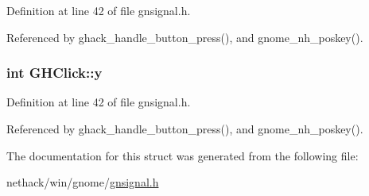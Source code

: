 Definition at line 42 of file gnsignal.\+h.



Referenced by ghack\+\_\+handle\+\_\+button\+\_\+press(), and gnome\+\_\+nh\+\_\+poskey().

\hypertarget{structGHClick_a5d3940337259fe197aa857bf98fb09cb}{
\subsubsection[{y}]{\setlength{\rightskip}{0pt plus 5cm}int G\+H\+Click\+::y}}\label{structGHClick_a5d3940337259fe197aa857bf98fb09cb}


Definition at line 42 of file gnsignal.\+h.



Referenced by ghack\+\_\+handle\+\_\+button\+\_\+press(), and gnome\+\_\+nh\+\_\+poskey().



The documentation for this struct was generated from the following file\+:\begin{DoxyCompactItemize}
\item 
nethack/win/gnome/\hyperlink{gnsignal_8h}{gnsignal.\+h}\end{DoxyCompactItemize}
